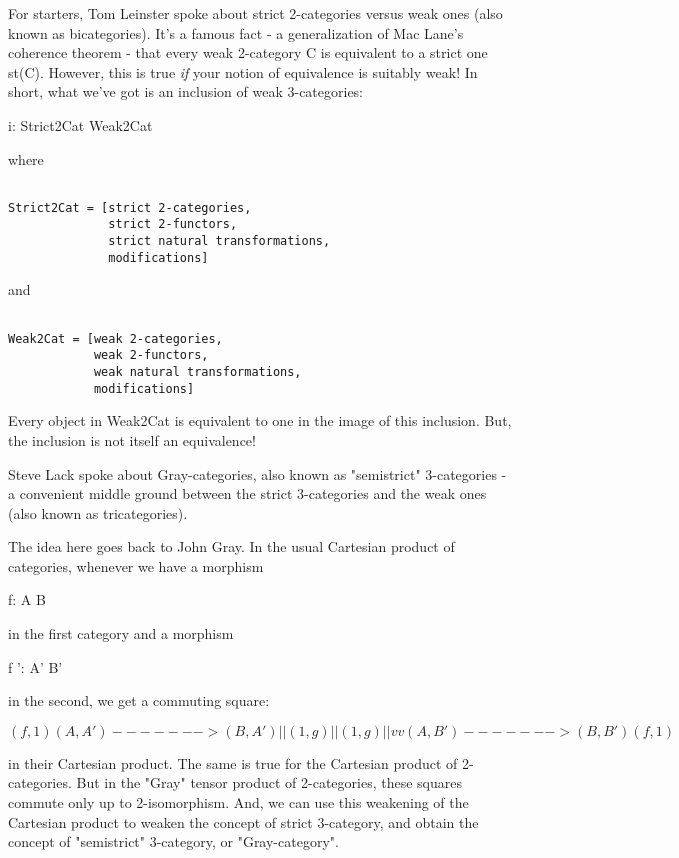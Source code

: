 For starters, Tom Leinster spoke about strict 2-categories versus weak
ones (also known as bicategories).  It's a famous fact - a
generalization of Mac Lane's coherence theorem - that every weak
2-category C is equivalent to a strict one st(C).  However, this is
true \emph{if} your notion of equivalence is suitably weak!  In
short, what we've got is an inclusion of weak 3-categories:

i: Strict2Cat \to  Weak2Cat

where 


\begin{verbatim}

Strict2Cat = [strict 2-categories, 
              strict 2-functors, 
              strict natural transformations,
              modifications]
\end{verbatim}
    
and 


\begin{verbatim}

Weak2Cat = [weak 2-categories,
            weak 2-functors,
            weak natural transformations,
            modifications]
\end{verbatim}
    
Every object in Weak2Cat is equivalent to one in the image of
this inclusion.  But, the inclusion is not itself an equivalence!

Steve Lack spoke about Gray-categories, also known as
"semistrict" 3-categories - a convenient middle ground
between the strict 3-categories and the weak ones (also known as
tricategories).

The idea here goes back to John Gray.  In the usual Cartesian 
product of categories, whenever we have a morphism

f: A \to  B

in the first category and a morphism

f ': A' \to  B'

in the second, we get a commuting square:
           

$$

           (f,1)
   (A,A') -------> (B,A')
     |               |
(1,g)|               |(1,g)
     |               |
     v               v
   (A,B') -------> (B,B')
           (f,1)
$$
    

in their Cartesian product.  The same is true for the Cartesian
product of 2-categories.  But in the "Gray" tensor product
of 2-categories, these squares commute only up to 2-isomorphism.  And,
we can use this weakening of the Cartesian product to weaken the
concept of strict 3-category, and obtain the concept of
"semistrict" 3-category, or "Gray-category".

